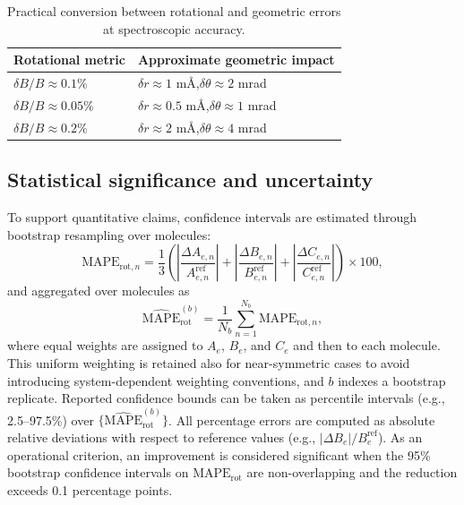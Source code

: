 \documentclass[journal=jctcce,manuscript=article]{achemso}
\begin{document}
\begin{table}[ht]
\caption{Practical conversion between rotational and geometric errors at spectroscopic accuracy.}
\label{tab:rot_geom_conversion}
\centering
\begin{tabular}{ll}
\toprule
Rotational metric & Approximate geometric impact \\
\midrule
$\delta B/B \approx 0.1\%$ & $\delta r \approx 1$ m\AA,\quad $\delta\theta \approx 2$ mrad \\
$\delta B/B \approx 0.05\%$ & $\delta r \approx 0.5$ m\AA,\quad $\delta\theta \approx 1$ mrad \\
$\delta B/B \approx 0.2\%$ & $\delta r \approx 2$ m\AA,\quad $\delta\theta \approx 4$ mrad \\
\bottomrule
\end{tabular}
\end{table}

\subsection{Statistical significance and uncertainty}
To support quantitative claims, confidence intervals are estimated through bootstrap resampling over molecules:
\begin{equation}
\mathrm{MAPE}_{\mathrm{rot},n}=\frac{1}{3}\left(
\left|\frac{\Delta A_{e,n}}{A_{e,n}^{\mathrm{ref}}}\right|+
\left|\frac{\Delta B_{e,n}}{B_{e,n}^{\mathrm{ref}}}\right|+
\left|\frac{\Delta C_{e,n}}{C_{e,n}^{\mathrm{ref}}}\right|
\right)\times 100,
\end{equation}
and aggregated over molecules as
\begin{equation}
\widehat{\mathrm{MAPE}}_{\mathrm{rot}}^{(b)}=\frac{1}{N_b}\sum_{n=1}^{N_b}\mathrm{MAPE}_{\mathrm{rot},n},
\end{equation}
where equal weights are assigned to $A_e$, $B_e$, and $C_e$ and then to each molecule. This uniform weighting is retained also for near-symmetric cases to avoid introducing system-dependent weighting conventions, and $b$ indexes a bootstrap replicate. Reported confidence bounds can be taken as percentile intervals (e.g., 2.5--97.5\%) over $\{\widehat{\mathrm{MAPE}}_{\mathrm{rot}}^{(b)}\}$.
All percentage errors are computed as absolute relative deviations with respect to reference values (e.g., $|\Delta B_e|/B_e^{\mathrm{ref}}$).
As an operational criterion, an improvement is considered significant when the 95\% bootstrap confidence intervals on $\mathrm{MAPE}_{\mathrm{rot}}$ are non-overlapping and the reduction exceeds 0.1 percentage points.
\end{document}
